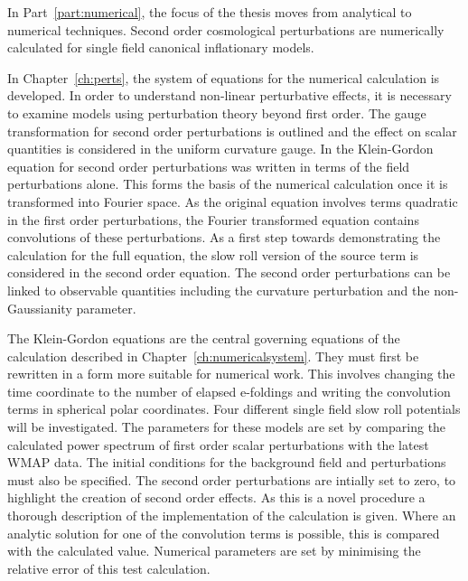 In Part~\ref{part:numerical}, the focus of the thesis moves from analytical to
numerical
techniques. Second order cosmological perturbations are numerically calculated for
single field canonical inflationary models.

In Chapter~\ref{ch:perts}, the system of equations for the numerical calculation is
developed. In order to understand non-linear perturbative effects, it is necessary to
examine models using perturbation theory beyond first order. The gauge
transformation for second order perturbations is outlined and the effect on
scalar quantities is considered in the uniform curvature gauge. In
 the Klein-Gordon equation for second order perturbations was
written in terms of the field perturbations alone. This forms the basis of the
numerical calculation once it is transformed into Fourier space. As the original
equation involves terms quadratic in the first order perturbations, the Fourier
transformed equation contains convolutions of these perturbations. As a first step
towards demonstrating the calculation for the full equation, the slow roll version of
the source term is considered in the second order equation. The second order
perturbations can be linked to observable quantities including the curvature
perturbation and the non-Gaussianity parameter.



The Klein-Gordon equations are the central governing equations of the 
calculation described in Chapter~\ref{ch:numericalsystem}. They must first be
rewritten in a form more suitable for numerical work. This involves changing the
time coordinate to the number of elapsed e-foldings and writing the convolution
terms in spherical polar coordinates. Four different single field slow roll
potentials will be investigated. The parameters for these models are set by
comparing
the calculated power spectrum of first order scalar perturbations with the latest
WMAP data. The initial conditions for the background field and perturbations must
also be specified. The second order perturbations are intially set to zero, to
highlight the creation of second order effects. As this is a novel procedure a
thorough description of the implementation of the calculation is given. Where
an analytic solution for one of the convolution terms is possible, this is compared
with the calculated value. Numerical parameters are set by minimising the relative
error of this test calculation.


